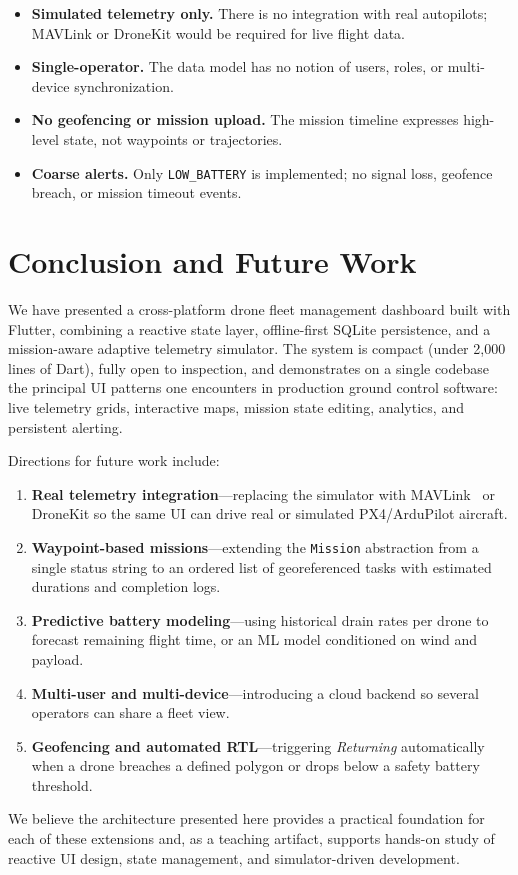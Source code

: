 \documentclass[conference]{IEEEtran}
\begin{document}
\begin{itemize}
    \item \textbf{Simulated telemetry only.} There is no integration with real autopilots; MAVLink or DroneKit would be required for live flight data.
    \item \textbf{Single-operator.} The data model has no notion of users, roles, or multi-device synchronization.
    \item \textbf{No geofencing or mission upload.} The mission timeline expresses high-level state, not waypoints or trajectories.
    \item \textbf{Coarse alerts.} Only \texttt{LOW\_BATTERY} is implemented; no signal loss, geofence breach, or mission timeout events.
\end{itemize}

\section{Conclusion and Future Work}
\label{sec:conclusion}

We have presented a cross-platform drone fleet management dashboard built with Flutter, combining a reactive state layer, offline-first SQLite persistence, and a mission-aware adaptive telemetry simulator. The system is compact (under 2{,}000 lines of Dart), fully open to inspection, and demonstrates on a single codebase the principal UI patterns one encounters in production ground control software: live telemetry grids, interactive maps, mission state editing, analytics, and persistent alerting.

Directions for future work include:

\begin{enumerate}
    \item \textbf{Real telemetry integration}---replacing the simulator with MAVLink~\cite{koubaa2019mavlink} or DroneKit so the same UI can drive real or simulated PX4/ArduPilot aircraft.
    \item \textbf{Waypoint-based missions}---extending the \texttt{Mission} abstraction from a single status string to an ordered list of georeferenced tasks with estimated durations and completion logs.
    \item \textbf{Predictive battery modeling}---using historical drain rates per drone to forecast remaining flight time, or an ML model conditioned on wind and payload.
    \item \textbf{Multi-user and multi-device}---introducing a cloud backend so several operators can share a fleet view.
    \item \textbf{Geofencing and automated RTL}---triggering \emph{Returning} automatically when a drone breaches a defined polygon or drops below a safety battery threshold.
\end{enumerate}

We believe the architecture presented here provides a practical foundation for each of these extensions and, as a teaching artifact, supports hands-on study of reactive UI design, state management, and simulator-driven development.



\end{document}
